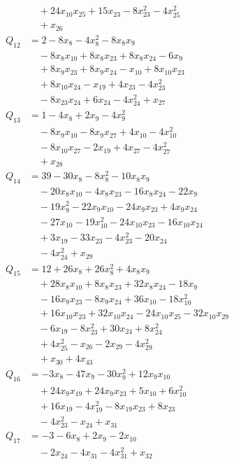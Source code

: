 \begin{align*}
&\quad +24x_{10}x_{25}+15x_{23}-8x_{23}^{2}-4x_{25}^{2}\\
&\quad +x_{26}\\
Q_{12}&=2-8x_{8}-4x_{8}^{2}-8x_{8}x_{9}\\
&\quad -8x_{8}x_{10}+8x_{8}x_{23}+8x_{8}x_{24}-6x_{9}\\
&\quad +8x_{9}x_{23}+8x_{9}x_{24}-x_{10}+8x_{10}x_{23}\\
&\quad +8x_{10}x_{24}-x_{19}+4x_{23}-4x_{23}^{2}\\
&\quad -8x_{23}x_{24}+6x_{24}-4x_{24}^{2}+x_{27}\\
Q_{13}&=1-4x_{8}+2x_{9}-4x_{9}^{2}\\
&\quad -8x_{9}x_{10}-8x_{9}x_{27}+4x_{10}-4x_{10}^{2}\\
&\quad -8x_{10}x_{27}-2x_{19}+4x_{27}-4x_{27}^{2}\\
&\quad +x_{28}\\
Q_{14}&=39-30x_{8}-8x_{8}^{2}-10x_{8}x_{9}\\
&\quad -20x_{8}x_{10}-4x_{8}x_{23}-16x_{8}x_{24}-22x_{9}\\
&\quad -19x_{9}^{2}-22x_{9}x_{10}-24x_{9}x_{23}+4x_{9}x_{24}\\
&\quad -27x_{10}-19x_{10}^{2}-24x_{10}x_{23}-16x_{10}x_{24}\\
&\quad +3x_{19}-33x_{23}-4x_{23}^{2}-20x_{24}\\
&\quad -4x_{24}^{2}+x_{29}\\
Q_{15}&=12+26x_{8}+26x_{8}^{2}+4x_{8}x_{9}\\
&\quad +28x_{8}x_{10}+8x_{8}x_{23}+32x_{8}x_{24}-18x_{9}\\
&\quad -16x_{9}x_{23}-8x_{9}x_{24}+36x_{10}-18x_{10}^{2}\\
&\quad +16x_{10}x_{23}+32x_{10}x_{24}-24x_{10}x_{25}-32x_{10}x_{29}\\
&\quad -6x_{19}-8x_{23}^{2}+30x_{24}+8x_{24}^{2}\\
&\quad +4x_{25}^{2}-x_{26}-2x_{29}-4x_{29}^{2}\\
&\quad +x_{30}+4x_{43}\\
Q_{16}&=-3x_{8}-47x_{9}-30x_{9}^{2}+12x_{9}x_{10}\\
&\quad +24x_{9}x_{19}+24x_{9}x_{23}+5x_{10}+6x_{10}^{2}\\
&\quad +16x_{19}-4x_{19}^{2}-8x_{19}x_{23}+8x_{23}\\
&\quad -4x_{23}^{2}-x_{24}+x_{31}\\
Q_{17}&=-3-6x_{8}+2x_{9}-2x_{10}\\
&\quad -2x_{24}-4x_{31}-4x_{31}^{2}+x_{32}\\

\end{align*}
